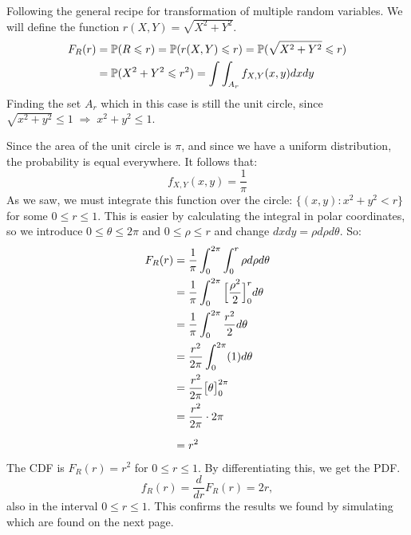 \medskip\noindent
Following the general recipe for transformation of multiple random variables. We will define
the function $r(X,Y) = \sqrt{X^2 + Y^2}$. %
\begin{align*}
    F_R(r) &= \P(R\leq r) = \P(r(X,Y)\leq r) = \P(\sqrt{X^2 + Y^2}\leq r)\\
    &= \P(X^2 + Y^2\leq r^2) = \int\int_{A_r}f_{X,Y}(x,y)dxdy
\end{align*}
Finding the set $A_r$ which in this case is still the unit circle,
since $\sqrt{x^2 + y^2} \leq 1 \;\Longrightarrow\; x^2 + y^2 \leq 1$.

Since the area of the unit circle is $\pi$, and since we have a uniform distribution,
the probability is equal everywhere. It follows that:
$$
f_{X,Y}(x,y) = \frac{1}{\pi}
$$
As we saw, we must integrate this function over the circle: $\{(x,y) : x^2 + y^2 < r\}$
for some $0\leq r \leq 1$.
This is easier by calculating the integral in polar coordinates, so we introduce
$0\leq \theta\leq 2\pi$ and $0\leq \rho\leq r$ and change $dxdy = \rho d\rho d\theta$.
So:
\begin{align*}
   F_R(r) &= \frac{1}{\pi}\int_{0}^{2\pi}\int_{0}^{r} \rho d\rho d\theta \\
   &= \frac{1}{\pi}\int_{0}^{2\pi}\Big[\frac{\rho^2}{2}\Big]_0^r d\theta \\
   &= \frac{1}{\pi}\int_{0}^{2\pi}\frac{r^2}{2} d\theta \\
   &= \frac{r^2}{2\pi}\int_{0}^{2\pi}(1) d\theta \\
   &= \frac{r^2}{2\pi}\big[\theta\big]_{0}^{2\pi} \\
   &= \frac{r^2}{2\pi}\cdot 2\pi \\
   &= \rule{0pt}{15pt}r^2 
\end{align*}
The CDF is $F_R(r) = r^2$ for $0\leq r\leq 1$. By differentiating this, we get the PDF.
$$
f_R(r) = \frac{d}{dr}F_R(r) = 2r,
$$
also in the interval $0\leq r\leq 1$. This confirms the results we found by simulating
which are found on the next page.
